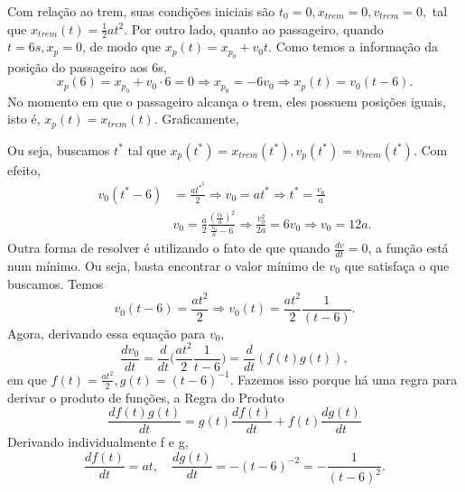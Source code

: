 \documentclass[PhysicsI/physics_notes.tex]{subfiles}
\begin{document}
Com relação ao trem, suas condições iniciais são $t_{0} = 0, x_{trem} = 0, v_{trem} = 0,$ tal que $x_{trem}(t) = \frac{1}{2}at^{2}$.
Por outro lado, quanto ao passageiro, quando $t=6s, x_{p} = 0$, de modo que $x_{p}(t) = x_{p_0} + v_{0}t$. Como temos a informação da posição
do passageiro aos 6s,
$$
	x_{p}(6) = x_{p_{0}} + v_{0} \cdot6 = 0 \Rightarrow x_{p_{0}} = -6v_{0} \Rightarrow x_{p}(t) = v_{0}(t-6).
$$
No momento em que o passageiro alcança o trem, eles possuem posições iguais, isto é, $x_{p}(t) = x_{trem}(t)$. Graficamente,
\begin{center}
\end{center}
Ou seja, buscamos $t^{*}$ tal que $x_{p}(t^{*}) = x_{trem}(t^{*}), v_{p}(t^{*}) = v_{trem}(t^{*})$. Com efeito,
\begin{align*}
	v_{0}(t^{*} - 6) & = \frac{at^{*^{2}}}{2} \Rightarrow v_{0} = at^{*} \Rightarrow t^{*} = \frac{v_{0}}{a}                                                 \\
	                 & v_{0} = \frac{a}{2}\frac{(\frac{v_{0}}{a})^{2}}{\frac{v_{0}}{a}-6} \Rightarrow \frac{v_{0}^{2}}{2a} = 6v_{0} \Rightarrow v_{0} = 12a.
\end{align*}
Outra forma de resolver é utilizando o fato de que quando $\frac{dv}{dt} = 0$, a função está num mínimo. Ou seja, basta encontrar
o valor mínimo de $v_{0}$ que satisfaça o que buscamos. Temos
$$
	v_{0}(t-6) = \frac{at^{2}}{2} \Rightarrow v_{0}(t) = \frac{at^{2}}{2}\frac{1}{(t-6)}.
$$
Agora, derivando essa equação para $v_{0},$
$$
	\frac{dv_{0}}{dt} = \frac{d}{dt}\biggl(\frac{at^{2}}{2}\frac{1}{t-6}\biggr) = \frac{d}{dt}(f(t)g(t)),
$$
em que $f(t) = \frac{at^{2}}{2}, g(t) = (t-6)^{-1}$. Fazemos isso porque há uma regra para derivar o produto de funções,
a Regra do Produto
$$
	\boxed{\frac{df(t)g(t)}{dt}= g(t)\frac{df(t)}{dt} + f(t)\frac{dg(t)}{dt}}
$$
Derivando individualmente f e g,
$$
	\frac{df(t)}{dt} = at, \quad \frac{dg(t)}{dt} = -(t-6)^{-2} = -\frac{1}{(t-6)^{2}}.
$$
\end{document}
